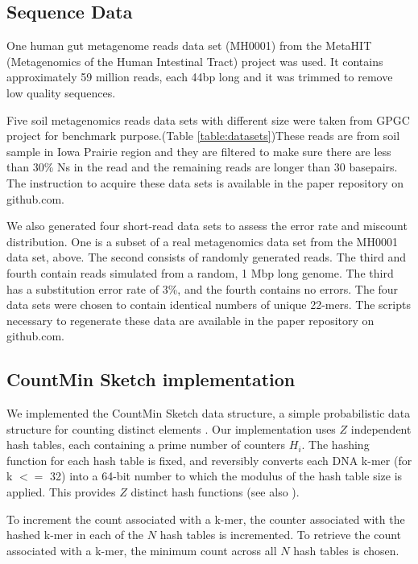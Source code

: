 \documentclass{article}
\begin{document}
\subsection{Sequence Data}

One human gut metagenome reads data set (MH0001) from the 
MetaHIT (Metagenomics of the Human Intestinal Tract) project\cite{Qin2010} was used. 
It contains approximately 59 million reads, each 44bp long and it was trimmed to remove low quality sequences. 

Five soil metagenomics reads data sets with different size were taken
from GPGC project for benchmark purpose.(Table \ref{table:datasets})These reads are from soil sample in Iowa Prairie region and they are 
filtered to make sure there are less than 30\% Ns in the read and the remaining reads are longer than 30 basepairs.
The instruction to acquire these data sets is available in the paper repository on github.com.


We also generated four short-read data sets to assess the error
rate and miscount distribution. One is a subset of a real
metagenomics data set from the MH0001 data set, above. The second
consists of randomly generated reads. The third and fourth contain
reads simulated from a random, 1 Mbp long genome.  The third has a
substitution error rate of 3\%, and the fourth contains no errors. The
four data sets were chosen to contain identical numbers of unique
22-mers.  The scripts necessary to regenerate these data are available
in the paper repository on github.com.

\subsection{CountMin Sketch implementation}

We implemented the CountMin Sketch data structure, a simple
probabilistic data structure for counting distinct elements
\cite{Cormode2005}.  Our implementation uses $Z$ independent hash
tables, each containing a prime number of counters $H_i$.  The hashing
function for each hash table is fixed, and reversibly converts each
DNA k-mer (for k $<=$ 32) into a 64-bit number to which the modulus of
the hash table size is applied.  This provides $Z$ distinct hash
functions (see also \cite{adina2013}).

To increment the count associated with a k-mer, the counter associated
with the hashed k-mer in each of the $N$ hash tables is incremented.
To retrieve the count associated with a k-mer, the minimum count
across all $N$ hash tables is chosen.
\end{document}
